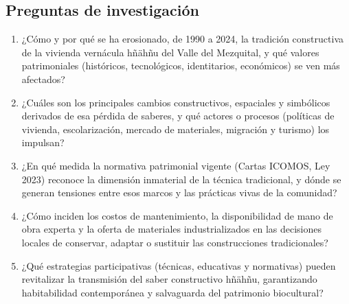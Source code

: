 \subsection{Preguntas de investigación}

\begin{enumerate}
  \item {¿Cómo y por qué se ha erosionado, de 1990 a 2024, la tradición constructiva de la vivienda vernácula hñähñu del Valle del Mezquital, y qué valores patrimoniales (históricos, tecnológicos, identitarios, económicos) se ven más afectados?}

  \item {¿Cuáles son los principales cambios constructivos, espaciales y simbólicos derivados de esa pérdida de saberes, y qué actores o procesos (políticas de vivienda, escolarización, mercado de materiales, migración y turismo) los impulsan?}

  \item {¿En qué medida la normativa patrimonial vigente (Cartas ICOMOS, Ley 2023) reconoce la dimensión inmaterial de la técnica tradicional, y dónde se generan tensiones entre esos marcos y las prácticas vivas de la comunidad?}

  \item {¿Cómo inciden los costos de mantenimiento, la disponibilidad de mano de obra experta y la oferta de materiales industrializados en las decisiones locales de conservar, adaptar o sustituir las construcciones tradicionales?}

  \item {¿Qué estrategias participativas (técnicas, educativas y normativas) pueden revitalizar la transmisión del saber constructivo hñähñu, garantizando habitabilidad contemporánea y salvaguarda del patrimonio biocultural?}
\end{enumerate}
